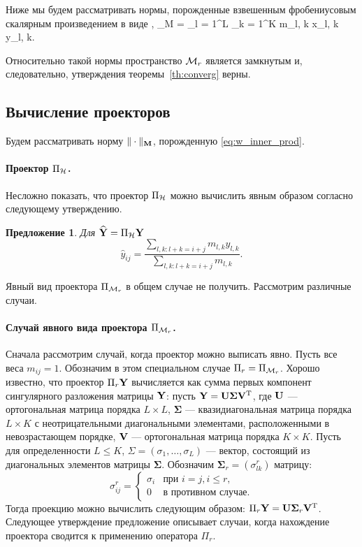 \documentclass[12pt,a4paper,fleqn,leqno]{article}
\newtheorem{proposition}{Предложение}%
\begin{document}
Ниже мы будем рассматривать нормы, порожденные взвешенным фробениусовым скалярным произведением в виде
\be
\label{eq:w_inner_prod}
\langle\bfX, \bfY\rangle_M = \sum_{l = 1}^L \sum_{k = 1}^K m_{l, k} x_{l, k} y_{l, k}.
\ee

Относительно такой нормы пространство $\mathcal{M}_r$ является замкнутым и, следовательно, утверждения теоремы~\ref{th:converg} верны.


\subsection{Вычисление проекторов}

Будем рассматривать норму $\|\cdot\|_{\mathbf{M}}$, порожденную \eqref{eq:w_inner_prod}.

\paragraph{Проектор $\Pi_{\mathcal{H}}$.} Несложно показать, что проектор $\Pi_{\mathcal{H}}$
можно вычислить явным образом согласно следующему утверждению.

\begin{proposition}
Для $\widehat{\mathbf{Y}}=\Pi_{\mathcal{H}} \mathbf{Y}$
\begin{equation*}
\hat{y}_{ij} = \frac{\sum_{l,k: l+k=i+j} m_{l,k} y_{l,k}}{\sum_{l,k: l+k=i+j} m_{l,k}}.
\end{equation*}
\end{proposition}

Явный вид проектора $\Pi_{\mathcal{M}_r}$ в общем случае не получить.
Рассмотрим различные случаи.

\paragraph{Случай явного вида проектора $\Pi_{\mathcal{M}_r}$.} Сначала рассмотрим случай, когда проектор можно выписать явно.
Пусть все веса $m_{ij}=1$. Обозначим в этом специальном случае $\Pi_r=\Pi_{\mathcal{M}_r}$.
Хорошо известно, что проектор $\Pi_{r} \mathbf{Y}$
вычисляется как сумма первых компонент сингулярного разложения матрицы $\mathbf{Y}$: пусть $\mathbf{Y} = \mathbf{U} \mathbf{\Sigma} \mathbf{V}^{\mathrm{T}}$, где $\mathbf{U}$ --- ортогональная матрица порядка $L \times L$, $\mathbf{\Sigma}$ --- квазидиагональная матрица порядка $L \times K$ с неотрицательными диагональными элементами, расположенными в невозрастающем порядке, $\mathbf{V}$ --- ортогональная матрица порядка $K \times K$. Пусть для определенности $L\le K$, $\Sigma = (\sigma_1, \ldots, \sigma_L)$ --- вектор, состоящий из диагональных элементов матрицы $\mathbf{\Sigma}$. Обозначим $\mathbf{\Sigma}_r = (\sigma^r_{l k})$ матрицу:
\begin{equation*}
\sigma^r_{i j} = \begin{cases}
\sigma_i & \text{при $i = j, i \le r,$}\\
0 & \text{в противном случае}.
\end{cases}
\end{equation*}
Тогда проекцию можно вычислить следующим образом: $\Pi_{r} \mathbf{Y}  = \mathbf{U} \mathbf{\Sigma}_r \mathbf{V}^{\mathrm{T}}$.
Следующее утверждение предложение описывает случаи, когда нахождение проектора
сводится к применению оператора $\Pi_r$. %
\end{document}
